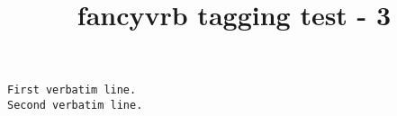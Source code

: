 \documentclass{article}
\title{fancyvrb tagging test - 3}
\begin{document}
\begin{Verbatim}[frame=single,label=My text]
First verbatim line.
Second verbatim line.
\end{Verbatim}
\end{document}
